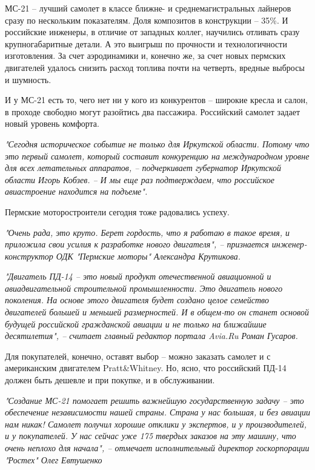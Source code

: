 МС-21 – лучший самолет в классе ближне- и среднемагистральных лайнеров сразу по
нескольким показателям. Доля композитов в конструкции – 35\%. И российские
инженеры, в отличие от западных коллег, научились отливать сразу
крупногабаритные детали. А это выигрыш по прочности и технологичности
изготовления. За счет аэродинамики и, конечно же, за счет новых пермских
двигателей удалось снизить расход топлива почти на четверть, вредные выбросы и
шумность.

И у МС-21 есть то, чего нет ни у кого из конкурентов – широкие кресла и салон,
в проходе свободно могут разойтись два пассажира. Российский самолет задает
новый уровень комфорта.

\begin{leftbar}
	\begingroup
		\em "Сегодня историческое событие не только для Иркутской области. Потому
				что это первый самолет, который составит конкуренцию на международном
				уровне для всех летательных аппаратов, – подчеркивает губернатор
				Иркутской области Игорь Кобзев. – И мы еще раз подтверждаем, что
				российское авиастроение находится на подъеме".
	\endgroup
\end{leftbar}

Пермские моторостроители сегодня тоже радовались успеху.

\begin{leftbar}
	\begingroup
		\em "Очень рада, это круто. Берет гордость, что я работаю в такое время, и
				приложила свои усилия к разработке нового двигателя", – признается
				инженер-конструктор ОДК "Пермские моторы" Александра Крутикова.
	\endgroup
\end{leftbar}

\begin{leftbar}
	\begingroup
		\em "Двигатель ПД-14 – это новый продукт отечественной авиационной и
				авиадвигательной строительной промышленности. Это двигатель нового
				поколения.  На основе этого двигателя будет создано целое семейство
				двигателей большей и меньшей размерностей. И в общем-то он станет
				основой будущей российской гражданской авиации и не только на ближайшие
				десятилетия", – считает главный редактор портала Avia.Ru Роман Гусаров.
	\endgroup
\end{leftbar}

Для покупателей, конечно, оставят выбор – можно заказать самолет и с
американским двигателем Pratt\&Whitney. Но, ясно, что российский ПД-14 должен
быть дешевле и при покупке, и в обслуживании.

\begin{leftbar}
	\begingroup
		\em "Создание МС-21 помогает решить важнейшую государственную задачу – это
обеспечение независимости нашей страны. Страна у нас большая, и без авиации нам
никак! Самолет получил хорошие отклики у экспертов, и у производителей, и у
покупателей. У нас сейчас уже 175 твердых заказов на эту машину, что очень
неплохо для начала", – отмечает исполнительный директор госкорпорации "Ростех"
Олег Евтушенко
	\endgroup
\end{leftbar}

